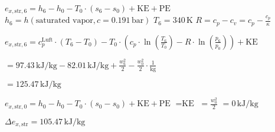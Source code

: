 \( e_{x,\text{str},6} = h_6 - h_0 - T_0 \cdot (s_6 - s_0) + \text{KE} + \text{PE} \)  
\( h_6 = h(\text{saturated vapor}, c = 0.191 \, \text{bar}) \)  
\( T_6 = 340 \, \text{K} \)  
\( R = c_p - c_v = c_p - \frac{c_p}{\kappa} \)  

\( e_{x,\text{str},6} = c_p^{\text{Luft}} \cdot (T_6 - T_0) - T_0 \cdot \left( c_p \cdot \ln \left( \frac{T_6}{T_0} \right) - R \cdot \ln \left( \frac{p_6}{p_0} \right) \right) + \text{KE} \)  

\( = 97.43 \, \text{kJ/kg} - 82.01 \, \text{kJ/kg} + \frac{w_6^2}{2} - \frac{w_0^2}{2} \cdot \frac{1}{\text{kg}} \)  

\( = 125.47 \, \text{kJ/kg} \)  

\( e_{x,\text{str},0} = h_0 - h_0 - T_0 \cdot (s_0 - s_0) + \text{KE} + \text{PE} \)  
\( = \text{KE} \)  
\( = \frac{w_0^2}{2} \)  
\( = 0 \, \text{kJ/kg} \)  

\( \Delta e_{x,\text{str}} = 105.47 \, \text{kJ/kg} \)